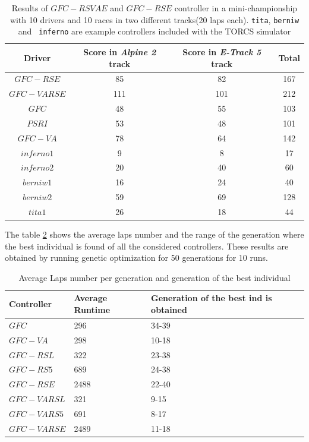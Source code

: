 \documentclass[10pt,journal,compsoc]{IEEEtran}
\begin{document}
\begin{table}[ht]
	\centering
	{\scriptsize
		\caption{ Results of $GFC-RSVAE$ and $GFC-RSE$ controller in a mini-championship with 10 drivers and 10
			races in two different tracks(20 laps each). {\tt tita}, {\tt berniw} and {\tt
				inferno} are example controllers included with the TORCS
			simulator \cite{torcs4}}
		{
			\begin{tabular}{|c|c|c||c|}
				\hline
				Driver&Score in \textit{Alpine 2} track &Score in \textit{E-Track 5} track &Total\\
				\hline
				\hline
$GFC-RSE$&	85&	82&	167\\
$GFC-VARSE$&111&101&212\\
$GFC$&		48&	55&	103\\
$PSRI$&		53&	48&	101\\
$GFC-VA$&	78&	64&	142\\
$inferno1$&	9&	8&	17\\
$inferno2$&	20&	40&	60\\
$berniw1$&	16&	24&	40\\
$berniw2$&	59&	69&	128\\
$tita1$&	26&	18&	44\\
					\hline
				
			\end{tabular}
		}\label{tab:allsresults}
	}
\end{table}
%




The table \ref{tab:time} shows the average laps number and the range of the generation where the best individual is found of all the considered controllers. These results are obtained by running genetic optimization for 50 generations for 10 runs. 

\begin{table}[!ht]
	\centering
	{\scriptsize
		\caption{Average Laps number per generation  and generation of the best individual}
		\label{tab:time}
		\begin{tabular}{|p{2.85cm}|p{1.65cm}|p{1.65cm}|}
			\hline 	
			\hline  
			Controller& \textbf{Average Runtime}&\textbf{Generation of the best ind is obtained}\\					
			\hline \textbf{\textbf{$GFC$}}&296 &34-39\\
			\hline \textbf{$GFC-VA$}&298	&10-18\\	
			\hline \textbf{$GFC-RSL$}& 322&23-38\\	
			\hline \textbf{$GFC-RS5$}&689	&24-38\\	
			\hline \textbf{$GFC-RSE$}&	2488&22-40\\	
			\hline \textbf{$GFC-VARSL$}&321	&9-15\\	
			\hline\textbf{$GFC-VARS5$}&	691&8-17\\	
			\hline\textbf{$GFC-VARSE$}&2489	&11-18\\					
			\hline 
		\end{tabular}
		
	}
\end{table} 
\end{document}
